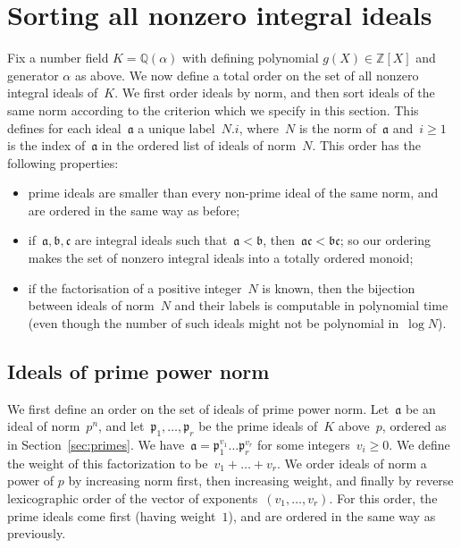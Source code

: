 \documentclass{article}
\def\Z{{\mathbb Z}}
\def\Q{{\mathbb Q}}
\def\a{{\mathfrak a}}
\def\b{{\mathfrak b}}
\def\idc{{\mathfrak c}}
\def\p{{\mathfrak p}}
\begin{document}
\section{Sorting all nonzero integral ideals}
\label{sec:ideals}
Fix a number field $K=\Q(\alpha)$ with defining polynomial
$g(X)\in\Z[X]$ and generator $\alpha$ as above.  We now define a total
order on the set of all nonzero integral ideals of~$K$.  We first
order ideals by norm, and then sort ideals of the same norm according
to the criterion which we specify in this section. This defines for
each ideal~$\a$ a unique label~$N.i$, where~$N$ is the norm of~$\a$
and~$i\ge 1$ is the index of~$\a$ in the ordered list of ideals of
norm~$N$.  This order has the following properties:
\begin{itemize}
  \item prime ideals are smaller than every non-prime ideal of the same norm,
    and are ordered in the same way as before;
  \item if~$\a,\b,\idc$ are integral ideals such that~$\a<\b$,
    then~$\a\idc<\b\idc$; so our ordering makes the set of nonzero
    integral ideals into a totally ordered monoid;
  \item if the factorisation of a positive integer~$N$ is known, then the
    bijection between ideals of norm~$N$ and their labels is computable in
    polynomial time (even though the number of such ideals might not be
    polynomial in~$\log N$).
\end{itemize}

\subsection{Ideals of prime power norm}\label{sec:primepowernorm}

We first define an order on the set of ideals of prime power
norm. Let~$\a$ be an ideal of norm~$p^n$, and let~$\p_1,\dots,\p_r$ be
the prime ideals of~$K$ above~$p$, ordered as in
Section~\ref{sec:primes}. We have~$\a = \p_1^{v_1}\dots \p_r^{v_r}$
for some integers~$v_i\ge 0$. We define the weight of this
factorization to be~$v_1+\dots+v_r$. We order ideals of norm a power
of $p$ by increasing norm first, then increasing weight, and finally
by reverse lexicographic order of the vector of
exponents~$(v_1,\dots,v_r)$. For this order, the prime ideals come
first (having weight~$1$), and are ordered in the same way as
previously.
\end{document}
